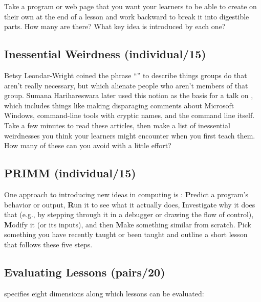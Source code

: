 Take a program or web page that you want your learners to be able to
create on their own at the end of a lesson and work backward to break it
into digestible parts. How many are there? What key idea is introduced
by each one?

\subsection*{Inessential Weirdness (individual/15)}

Betsy Leondar-Wright coined the phrase ``'' to describe things groups do that
aren't really necessary, but which alienate people who aren't members
of that group. Sumana Harihareswara later used this notion as the
basis for a talk on , which includes things
like making disparaging comments about Microsoft Windows, command-line
tools with cryptic names, and the command line itself. Take a few
minutes to read these articles, then make a list of inessential
weirdnesses you think your learners might encounter when you first
teach them. How many of these can you avoid with a little effort?

\subsection*{PRIMM (individual/15)}

One approach to introducing new ideas in computing is :
\textbf{P}redict a program's behavior or output, \textbf{R}un it to see what it
actually does, \textbf{I}nvestigate why it does that (e.g., by stepping
through it in a debugger or drawing the flow of control), \textbf{M}odify
it (or its inputs), and then \textbf{M}ake something similar from scratch.
Pick something you have recently taught or been taught and outline a
short lesson that follows these five steps.

\subsection*{Evaluating Lessons (pairs/20)}

\cite{Mart2017} specifies eight dimensions along which lessons can be
evaluated:

